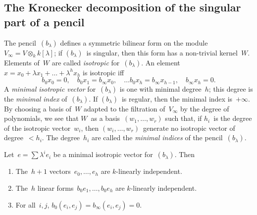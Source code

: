 \documentclass{lms}%
\begin{document}
\subsection{The Kronecker decomposition of the singular part of a pencil} %
\label{SS:Kronecker-reduction}
The pencil~$(b_{λ})$ defines a symmetric bilinear form on the
module~$V_{∞} = V ⊗_{k} k[λ]$; if $(b_{λ})$~is singular, then this form
has a non-trivial kernel~$W$. Elements of~$W$ are called \emph{isotropic}
for~$(b_{λ})$. An element~$x = x_0 + λ x_1 + … + λ^h x_h$ is isotropic iff
\begin{equation}\label{eq:isotropic}
b_0 x_0 = 0, \quad
b_0 x_1 = b_{∞} x_0, \quad …
b_0 x_h = b_{∞} x_{h-1}, \quad
b_{∞} x_{h} = 0.
\end{equation}
A \emph{minimal isotropic vector} for~$(b_{λ})$ is one with minimal
degree~$h$; this degree is the \emph{minimal index} of~$(b_{λ})$. If
$(b_{λ})$~is regular, then the minimal index is~$+∞$.
By choosing a basis of~$W$
adapted to the filtration of~$V_{∞}$ by the degree of polynomials, we see
that $W$~as a basis~$(w_1,…,w_r)$ such that, if $h_i$~is the degree of
the isotropic vector~$w_i$, then $(w_i,…,w_r)$~generate no isotropic
vector of degree~$< h_i$. The degree~$h_i$ are called the \emph{minimal
indices} of the pencil~$(b_{λ})$.
\begin{prop}\label{prop:minimal-indep}%
Let~$e = ∑ λ^i e_i$ be a minimal isotropic vector for~$(b_{λ})$. Then
\begin{enumerate}
\item The~$h+1$ vectors~$e_0, …, e_h$ are $k$-linearly independent.
\item The~$h$ linear forms~$b_{0} e_1, …, b_{0} e_h$ are $k$-linearly
independent.
\item For all~$i, j$, $b_{0}(e_i, e_j) = b_{∞}(e_i, e_j) = 0$.
\end{enumerate}
\end{prop}
\end{document}
